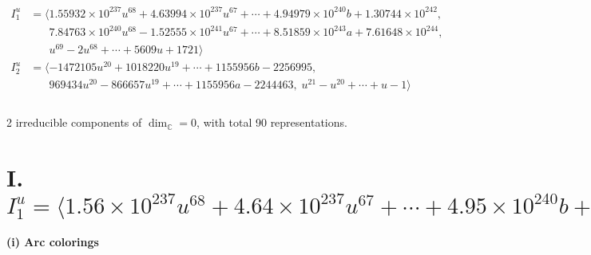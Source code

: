 \documentclass[1p]{elsarticle_modified}
\theoremstyle{definition}
\begin{document}
\begin{align*}
I^u_{1}&=\langle 
1.55932\times10^{237} u^{68}+4.63994\times10^{237} u^{67}+\cdots+4.94979\times10^{240} b+1.30744\times10^{242},\\
\phantom{I^u_{1}}&\phantom{= \langle  }7.84763\times10^{240} u^{68}-1.52555\times10^{241} u^{67}+\cdots+8.51859\times10^{243} a+7.61648\times10^{244},\\
\phantom{I^u_{1}}&\phantom{= \langle  }u^{69}-2 u^{68}+\cdots+5609 u+1721\rangle \\
I^u_{2}&=\langle 
-1472105 u^{20}+1018220 u^{19}+\cdots+1155956 b-2256995,\\
\phantom{I^u_{2}}&\phantom{= \langle  }969434 u^{20}-866657 u^{19}+\cdots+1155956 a-2244463,\;u^{21}- u^{20}+\cdots+u-1\rangle \\
\\
\end{align*}
\raggedright * 2 irreducible components of $\dim_{\mathbb{C}}=0$, with total 90 representations.\\
\newpage
\renewcommand{\arraystretch}{1}
\centering \section*{I. $I^u_{1}= \langle 1.56\times10^{237} u^{68}+4.64\times10^{237} u^{67}+\cdots+4.95\times10^{240} b+1.31\times10^{242},\;7.85\times10^{240} u^{68}-1.53\times10^{241} u^{67}+\cdots+8.52\times10^{243} a+7.62\times10^{244},\;u^{69}-2 u^{68}+\cdots+5609 u+1721 \rangle$}
\flushleft \textbf{(i) Arc colorings}\\
\end{document}
